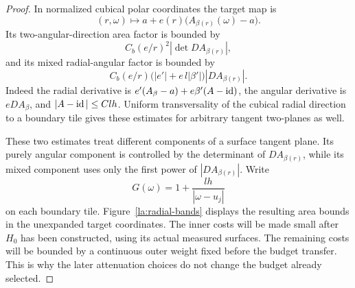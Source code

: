 \begin{proof}
In normalized cubical polar coordinates the target map is
\[
 (r,\omega)\longmapsto
       a+e(r)\bigl(A_{\beta(r)}(\omega)-a\bigr).
\]
Its two-angular-direction area factor is bounded by
\begin{equation}\label{la:two-angular}
 C_b(e/r)^2|\det DA_{\beta(r)}|,
\end{equation}
and its mixed radial-angular factor is bounded by
\begin{equation}\label{la:mixed-angular}
 C_b(e/r)\bigl(|e'|+e\,l|\beta'|\bigr)|DA_{\beta(r)}|.
\end{equation}
Indeed the radial derivative is
$e'(A_\beta-a)+e\beta'(A-\operatorname{id})$, the angular derivative is $eDA_\beta$,
and $|A-\operatorname{id}|\le Clh$.  Uniform transversality of the cubical radial
direction to a boundary tile gives these estimates for arbitrary
tangent two-planes as well.

These two estimates treat different components of a surface tangent
plane.  Its purely angular component is controlled by the determinant
of $DA_{\beta(r)}$, while its mixed component uses only the first power
of $|DA_{\beta(r)}|$.  Write
\[
 G(\omega)=1+\frac{lh}{|\omega-u_j|}
\]
on each boundary tile.  Figure~\ref{la:radial-bands} displays the
resulting area bounds in the unexpanded target coordinates.  The inner
costs will be made small after $H_0$ has been constructed, using its
actual measured surfaces.  The remaining costs will be bounded by a
continuous outer weight fixed before the budget transfer.  This is why
the later attenuation choices do not change the budget already selected.


\end{proof}
